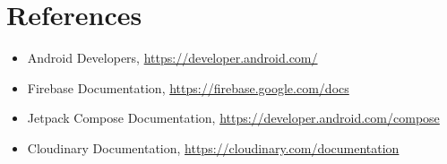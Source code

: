 \documentclass[12pt,a4paper]{report}
\begin{document}
\chapter*{References}
\begin{itemize}[leftmargin=*]
    \item Android Developers, \url{https://developer.android.com/}
    \item Firebase Documentation, \url{https://firebase.google.com/docs}
    \item Jetpack Compose Documentation, \url{https://developer.android.com/compose}
    \item Cloudinary Documentation, \url{https://cloudinary.com/documentation}
\end{itemize}
\end{document}
